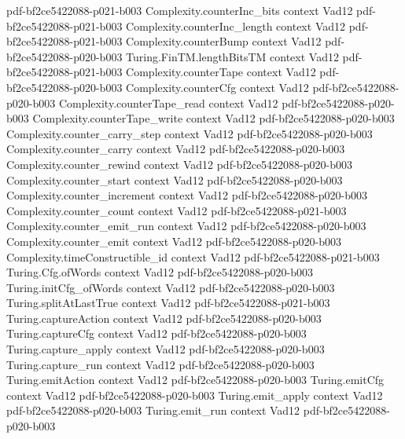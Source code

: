 \begin{theorem}
  {pdf-bf2ce5422088-p021-b003}
\proofstep
  {Complexity.counterInc_bits}
  {context}
  {Vad12}
  {pdf-bf2ce5422088-p021-b003}
\proofstep
  {Complexity.counterInc_length}
  {context}
  {Vad12}
  {pdf-bf2ce5422088-p021-b003}
\proofstep
  {Complexity.counterBump}
  {context}
  {Vad12}
  {pdf-bf2ce5422088-p020-b003}
\proofstep
  {Turing.FinTM.lengthBitsTM}
  {context}
  {Vad12}
  {pdf-bf2ce5422088-p021-b003}
\proofstep
  {Complexity.counterTape}
  {context}
  {Vad12}
  {pdf-bf2ce5422088-p020-b003}
\proofstep
  {Complexity.counterCfg}
  {context}
  {Vad12}
  {pdf-bf2ce5422088-p020-b003}
\proofstep
  {Complexity.counterTape_read}
  {context}
  {Vad12}
  {pdf-bf2ce5422088-p020-b003}
\proofstep
  {Complexity.counterTape_write}
  {context}
  {Vad12}
  {pdf-bf2ce5422088-p020-b003}
\proofstep
  {Complexity.counter_carry_step}
  {context}
  {Vad12}
  {pdf-bf2ce5422088-p020-b003}
\proofstep
  {Complexity.counter_carry}
  {context}
  {Vad12}
  {pdf-bf2ce5422088-p020-b003}
\proofstep
  {Complexity.counter_rewind}
  {context}
  {Vad12}
  {pdf-bf2ce5422088-p020-b003}
\proofstep
  {Complexity.counter_start}
  {context}
  {Vad12}
  {pdf-bf2ce5422088-p020-b003}
\proofstep
  {Complexity.counter_increment}
  {context}
  {Vad12}
  {pdf-bf2ce5422088-p020-b003}
\proofstep
  {Complexity.counter_count}
  {context}
  {Vad12}
  {pdf-bf2ce5422088-p021-b003}
\proofstep
  {Complexity.counter_emit_run}
  {context}
  {Vad12}
  {pdf-bf2ce5422088-p020-b003}
\proofstep
  {Complexity.counter_emit}
  {context}
  {Vad12}
  {pdf-bf2ce5422088-p020-b003}
\proofstep
  {Complexity.timeConstructible_id}
  {context}
  {Vad12}
  {pdf-bf2ce5422088-p021-b003}
\proofstep
  {Turing.Cfg.ofWords}
  {context}
  {Vad12}
  {pdf-bf2ce5422088-p020-b003}
\proofstep
  {Turing.initCfg_ofWords}
  {context}
  {Vad12}
  {pdf-bf2ce5422088-p020-b003}
\proofstep
  {Turing.splitAtLastTrue}
  {context}
  {Vad12}
  {pdf-bf2ce5422088-p021-b003}
\proofstep
  {Turing.captureAction}
  {context}
  {Vad12}
  {pdf-bf2ce5422088-p020-b003}
\proofstep
  {Turing.captureCfg}
  {context}
  {Vad12}
  {pdf-bf2ce5422088-p020-b003}
\proofstep
  {Turing.capture_apply}
  {context}
  {Vad12}
  {pdf-bf2ce5422088-p020-b003}
\proofstep
  {Turing.capture_run}
  {context}
  {Vad12}
  {pdf-bf2ce5422088-p020-b003}
\proofstep
  {Turing.emitAction}
  {context}
  {Vad12}
  {pdf-bf2ce5422088-p020-b003}
\proofstep
  {Turing.emitCfg}
  {context}
  {Vad12}
  {pdf-bf2ce5422088-p020-b003}
\proofstep
  {Turing.emit_apply}
  {context}
  {Vad12}
  {pdf-bf2ce5422088-p020-b003}
\proofstep
  {Turing.emit_run}
  {context}
  {Vad12}
  {pdf-bf2ce5422088-p020-b003}
\proofstep

\end{theorem}
